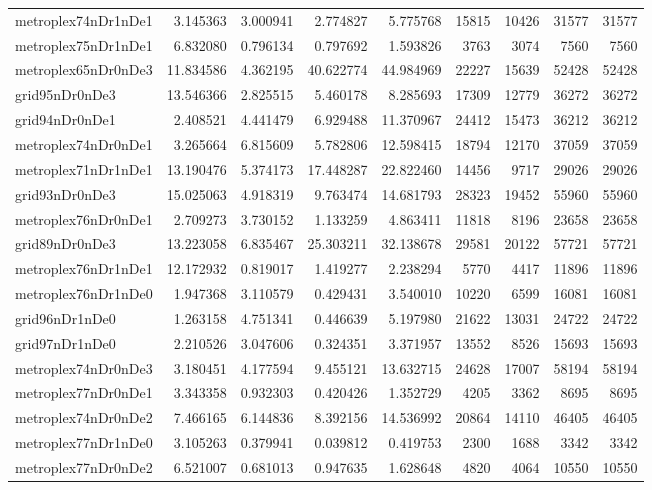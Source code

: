 \begin{longtable}{|l|r|r|r|r|r|r|r|r|}
metroplex74nDr1nDe1 & 3.145363 & 3.000941 & 2.774827 & 5.775768 & 15815 & 10426 & 31577 & 31577 \\
metroplex75nDr1nDe1 & 6.832080 & 0.796134 & 0.797692 & 1.593826 & 3763 & 3074 & 7560 & 7560 \\
metroplex65nDr0nDe3 & 11.834586 & 4.362195 & 40.622774 & 44.984969 & 22227 & 15639 & 52428 & 52428 \\
grid95nDr0nDe3 & 13.546366 & 2.825515 & 5.460178 & 8.285693 & 17309 & 12779 & 36272 & 36272 \\
grid94nDr0nDe1 & 2.408521 & 4.441479 & 6.929488 & 11.370967 & 24412 & 15473 & 36212 & 36212 \\
metroplex74nDr0nDe1 & 3.265664 & 6.815609 & 5.782806 & 12.598415 & 18794 & 12170 & 37059 & 37059 \\
metroplex71nDr1nDe1 & 13.190476 & 5.374173 & 17.448287 & 22.822460 & 14456 & 9717 & 29026 & 29026 \\
grid93nDr0nDe3 & 15.025063 & 4.918319 & 9.763474 & 14.681793 & 28323 & 19452 & 55960 & 55960 \\
metroplex76nDr0nDe1 & 2.709273 & 3.730152 & 1.133259 & 4.863411 & 11818 & 8196 & 23658 & 23658 \\
grid89nDr0nDe3 & 13.223058 & 6.835467 & 25.303211 & 32.138678 & 29581 & 20122 & 57721 & 57721 \\
metroplex76nDr1nDe1 & 12.172932 & 0.819017 & 1.419277 & 2.238294 & 5770 & 4417 & 11896 & 11896 \\
metroplex76nDr1nDe0 & 1.947368 & 3.110579 & 0.429431 & 3.540010 & 10220 & 6599 & 16081 & 16081 \\
grid96nDr1nDe0 & 1.263158 & 4.751341 & 0.446639 & 5.197980 & 21622 & 13031 & 24722 & 24722 \\
grid97nDr1nDe0 & 2.210526 & 3.047606 & 0.324351 & 3.371957 & 13552 & 8526 & 15693 & 15693 \\
metroplex74nDr0nDe3 & 3.180451 & 4.177594 & 9.455121 & 13.632715 & 24628 & 17007 & 58194 & 58194 \\
metroplex77nDr0nDe1 & 3.343358 & 0.932303 & 0.420426 & 1.352729 & 4205 & 3362 & 8695 & 8695 \\
metroplex74nDr0nDe2 & 7.466165 & 6.144836 & 8.392156 & 14.536992 & 20864 & 14110 & 46405 & 46405 \\
metroplex77nDr1nDe0 & 3.105263 & 0.379941 & 0.039812 & 0.419753 & 2300 & 1688 & 3342 & 3342 \\
metroplex77nDr0nDe2 & 6.521007 & 0.681013 & 0.947635 & 1.628648 & 4820 & 4064 & 10550 & 10550 \\

\end{longtable}
